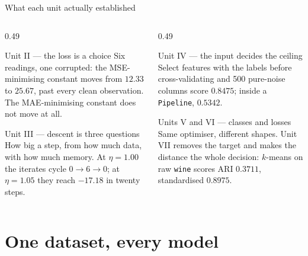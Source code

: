 \documentclass[aspectratio=169]{beamer}
\begin{document}
\begin{frame}[shrink=8]{What each unit actually established}
  \begin{columns}[T]
    \begin{column}{0.49\textwidth}
      \begin{block}{Unit II --- the loss is a choice}
        Six readings, one corrupted: the MSE-minimising constant moves from
        $12.33$ to $25.67$, past every clean observation. The MAE-minimising
        constant does not move at all.
      \end{block}
      \begin{block}{Unit III --- descent is three questions}
        How big a step, from how much data, with how much memory. At
        $\eta = 1.00$ the iterates cycle $0 \to 6 \to 0$; at $\eta = 1.05$
        they reach $-17.18$ in twenty steps.
      \end{block}
    \end{column}
    \begin{column}{0.49\textwidth}
      \begin{block}{Unit IV --- the input decides the ceiling}
        Select features with the labels before cross-validating and 500
        pure-noise columns score $0.8475$; inside a \texttt{Pipeline},
        $0.5342$.
      \end{block}
      \begin{block}{Units V and VI --- classes and losses}
        Same optimiser, different shapes. Unit VII removes the target and
        makes the distance the whole decision: $k$-means on raw
        \texttt{wine} scores ARI $0.3711$, standardised $0.8975$.
      \end{block}
    \end{column}
  \end{columns}
\end{frame}

\section[One dataset]{One dataset, every model}
\label{sec:zoo}
\end{document}
